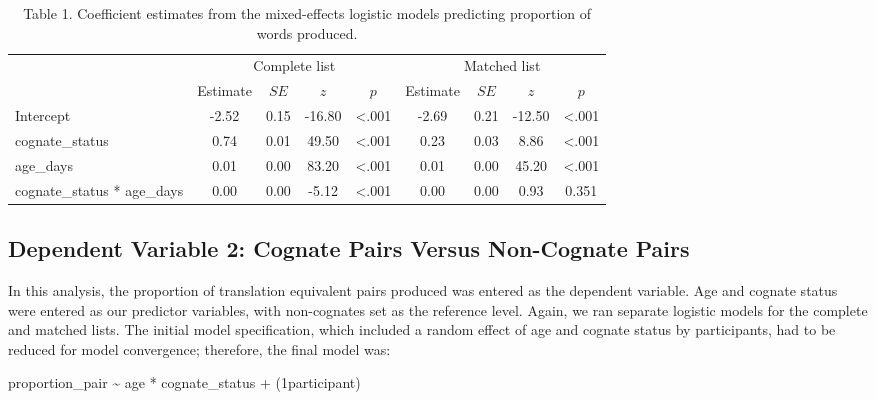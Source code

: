 \documentclass[
  english,
  ,man,floatsintext]{apa6}
\begin{document}
\begin{table}[tbp]

\begin{center}
\begin{threeparttable}

\caption{\label{tab:Table 1}Table 1. Coefficient estimates from the mixed-effects logistic models predicting proportion of words produced.}

\begin{tabular}{lcccccccc}
\toprule
 & \multicolumn{4}{c}{Complete list} & \multicolumn{4}{c}{Matched list} \\
\cmidrule(r){2-5} \cmidrule(r){6-9}
 & Estimate & $SE$ & $z$ & $p$ & Estimate & $SE$ & $z$ & $p$\\
\midrule
Intercept & -2.52 & 0.15 & -16.80 & <.001 & -2.69 & 0.21 & -12.50 & <.001\\
cognate\_status & 0.74 & 0.01 & 49.50 & <.001 & 0.23 & 0.03 & 8.86 & <.001\\
age\_days & 0.01 & 0.00 & 83.20 & <.001 & 0.01 & 0.00 & 45.20 & <.001\\
cognate\_status * age\_days & 0.00 & 0.00 & -5.12 & <.001 & 0.00 & 0.00 & 0.93 & 0.351\\
\bottomrule
\end{tabular}

\end{threeparttable}
\end{center}

\end{table}

\hypertarget{dependent-variable-2-cognate-pairs-versus-non-cognate-pairs}{%
\subsection{Dependent Variable 2: Cognate Pairs Versus Non-Cognate Pairs}\label{dependent-variable-2-cognate-pairs-versus-non-cognate-pairs}}

In this analysis, the proportion of translation equivalent pairs produced was entered as the dependent variable. Age and cognate status were entered as our predictor variables, with non-cognates set as the reference level. Again, we ran separate logistic models for the complete and matched lists. The initial model specification, which included a random effect of age and cognate status by participants, had to be reduced for model convergence; therefore, the final model was:

proportion\_pair \textasciitilde{} age * cognate\_status + (1\textbar participant)
\end{document}

